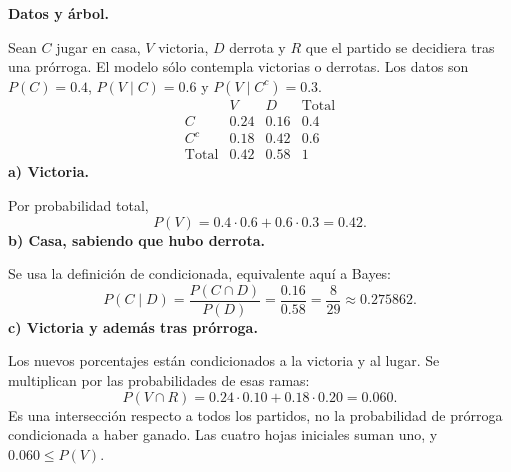 \textbf{Datos y árbol.}\par\nopagebreak[4]
Sean $C$ jugar en casa, $V$ victoria, $D$ derrota y $R$ que el partido se decidiera tras una prórroga. El modelo sólo contempla victorias o derrotas. Los datos son $P(C)=0.4$, $P(V\mid C)=0.6$ y $P(V\mid C^c)=0.3$.
\[
\begin{array}{c|rr|r}
&V&D&\text{Total}\\\hline
C&0.24&0.16&0.4\\
C^c&0.18&0.42&0.6\\\hline
\text{Total}&0.42&0.58&1
\end{array}
\]
\textbf{a) Victoria.}\par\nopagebreak[4]
Por probabilidad total,
\[
\boxed{P(V)=0.4\cdot0.6+0.6\cdot0.3=0.42.}
\]
\textbf{b) Casa, sabiendo que hubo derrota.}\par\nopagebreak[4]
Se usa la definición de condicionada, equivalente aquí a Bayes:
\[
\boxed{P(C\mid D)=\frac{P(C\cap D)}{P(D)}
=\frac{0.16}{0.58}=\frac8{29}\approx0.275862.}
\]
\textbf{c) Victoria y además tras prórroga.}\par\nopagebreak[4]
Los nuevos porcentajes están condicionados a la victoria y al lugar. Se multiplican por las probabilidades de esas ramas:
\[
\boxed{P(V\cap R)=0.24\cdot0.10+0.18\cdot0.20=0.060.}
\]
Es una intersección respecto a todos los partidos, no la probabilidad de prórroga condicionada a haber ganado. Las cuatro hojas iniciales suman uno, y $0.060\leq P(V)$.
